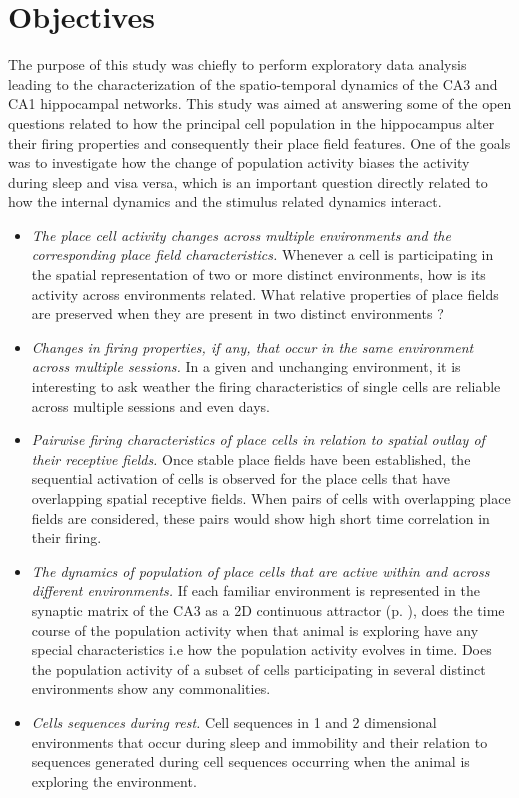 \section{Objectives}
The purpose of this study was chiefly to perform exploratory data analysis leading to the characterization of the spatio-temporal dynamics of the CA3 and CA1 hippocampal networks. This study was aimed at answering some of the  open questions related to how the principal cell population in the hippocampus alter their firing properties and consequently their place field features. One of the goals was to investigate how the change of population activity biases the activity during sleep and visa versa, which is an important question directly related to how the internal dynamics and the stimulus related dynamics interact. 
\begin{itemize}
\item \emph{The place cell activity changes across multiple environments and the corresponding place field characteristics.}
Whenever a cell is participating in the spatial representation of two or more distinct environments, how is its activity across environments related. What relative properties of place fields are preserved when they are present in two distinct environments ?
\item \emph{Changes in firing properties, if any, that occur in the same environment across multiple sessions.}
In a given and unchanging environment, it is interesting to ask weather the firing characteristics of single cells are reliable across multiple sessions and even days.
\item \emph{Pairwise firing characteristics of place cells in relation to spatial outlay of their receptive fields.}
Once stable place fields have been established, the sequential activation of cells is observed for the place cells that have overlapping spatial receptive fields. When pairs of cells with overlapping place fields are considered, these pairs would show high short time correlation in their firing.
\item \emph{The dynamics of population of place cells that are active within and across different environments.}
If each familiar environment is represented in the synaptic matrix of the CA3 as a 2D continuous attractor (p. \pageref{fixedpt}), does the time course of the population activity when that animal is exploring have any special characteristics i.e how the population activity evolves in time. Does the population activity of a subset of cells participating in several distinct environments show any commonalities.
\item \emph{Cells sequences during rest.} 
Cell sequences in 1 and 2 dimensional environments that occur during sleep and immobility and their relation to sequences generated during cell sequences occurring when the animal is exploring the environment. 
\end{itemize}
 